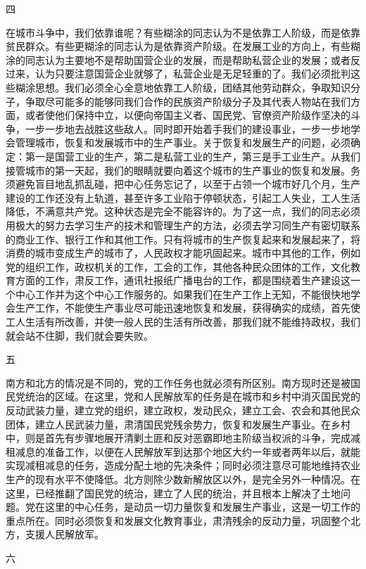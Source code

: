 \documentclass[UTF-8, a5paper, 12pt]{ctexart}
\begin{document}
四

在城市斗争中，我们依靠谁呢？有些糊涂的同志认为不是依靠工人阶级，而是依靠贫民群众。有些更糊涂的同志认为是依靠资产阶级。在发展工业的方向上，有些糊涂的同志认为主要地不是帮助国营企业的发展，而是帮助私营企业的发展；或者反过来，认为只要注意国营企业就够了，私营企业是无足轻重的了。我们必须批判这些糊涂思想。我们必须全心全意地依靠工人阶级，团结其他劳动群众，争取知识分子，争取尽可能多的能够同我们合作的民族资产阶级分子及其代表人物站在我们方面，或者使他们保持中立，以便向帝国主义者、国民党、官僚资产阶级作坚决的斗争，一步一步地去战胜这些敌人。同时即开始着手我们的建设事业，一步一步地学会管理城市，恢复和发展城市中的生产事业。关于恢复和发展生产的问题，必须确定：第一是国营工业的生产，第二是私营工业的生产，第三是手工业生产。从我们接管城市的第一天起，我们的眼睛就要向着这个城市的生产事业的恢复和发展。务须避免盲目地乱抓乱碰，把中心任务忘记了，以至于占领一个城市好几个月，生产建设的工作还没有上轨道，甚至许多工业陷于停顿状态，引起工人失业，工人生活降低，不满意共产党。这种状态是完全不能容许的。为了这一点，我们的同志必须用极大的努力去学习生产的技术和管理生产的方法，必须去学习同生产有密切联系的商业工作、银行工作和其他工作。只有将城市的生产恢复起来和发展起来了，将消费的城市变成生产的城市了，人民政权才能巩固起来。城市中其他的工作，例如党的组织工作，政权机关的工作，工会的工作，其他各种民众团体的工作，文化教育方面的工作，肃反工作，通讯社报纸广播电台的工作，都是围绕着生产建设这一个中心工作并为这个中心工作服务的。如果我们在生产工作上无知，不能很快地学会生产工作，不能使生产事业尽可能迅速地恢复和发展，获得确实的成绩，首先使工人生活有所改善，并使一般人民的生活有所改善，那我们就不能维持政权，我们就会站不住脚，我们就会要失败。

五

南方和北方的情况是不同的，党的工作任务也就必须有所区别。南方现时还是被国民党统治的区域。在这里，党和人民解放军的任务是在城市和乡村中消灭国民党的反动武装力量，建立党的组织，建立政权，发动民众，建立工会、农会和其他民众团体，建立人民武装力量，肃清国民党残余势力，恢复和发展生产事业。在乡村中，则是首先有步骤地展开清剿土匪和反对恶霸即地主阶级当权派的斗争，完成减租减息的准备工作，以便在人民解放军到达那个地区大约一年或者两年以后，就能实现减租减息的任务，造成分配土地的先决条件；同时必须注意尽可能地维持农业生产的现有水平不使降低。北方则除少数新解放区以外，是完全另外一种情况。在这里，已经推翻了国民党的统治，建立了人民的统治，并且根本上解决了土地问题。党在这里的中心任务，是动员一切力量恢复和发展生产事业，这是一切工作的重点所在。同时必须恢复和发展文化教育事业，肃清残余的反动力量，巩固整个北方，支援人民解放军。

六
\end{document}
